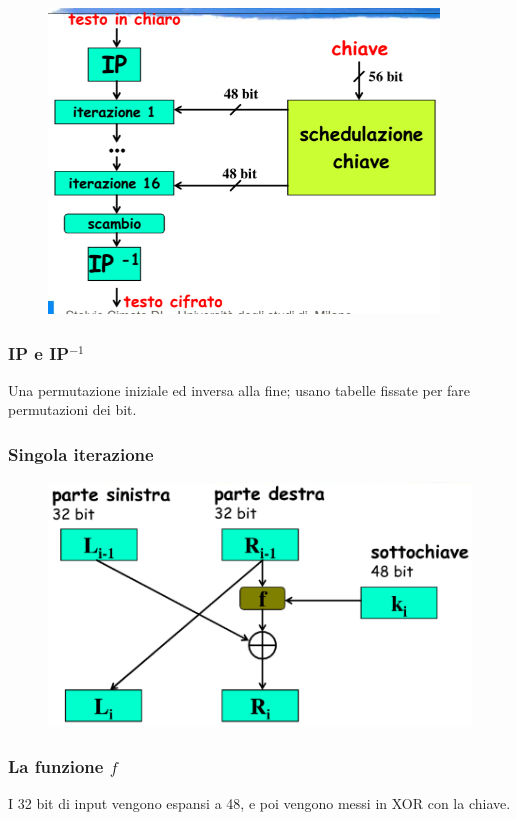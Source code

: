 \begin{figure}[H]
    \centering
    \includegraphics[width=0.7\linewidth]{chapters/chap03/images/des2.png}
\end{figure}

\subsubsection{IP e IP$^{-1}$}

Una permutazione iniziale ed inversa alla fine; usano tabelle fissate per fare 
permutazioni dei bit.

\subsubsection{Singola iterazione}

\begin{figure}[H]
    \centering
    \includegraphics[width=0.7\linewidth]{chapters/chap03/images/des3.png}
\end{figure}

\subsubsection{La funzione $f$}

\noindent I 32 bit di input vengono espansi a 48, e poi vengono messi in XOR con la chiave.


